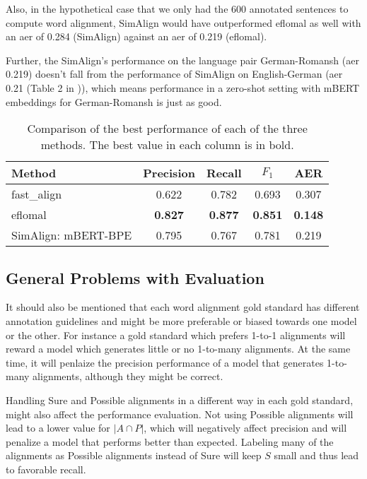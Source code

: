 Also, in the hypothetical case that we only had the 600 annotated sentences to compute word alignment, SimAlign would have outperformed eflomal as well with an \acrshort{aer} of 0.284 (SimAlign) against an \acrshort{aer} of 0.219 (eflomal). 

Further, the SimAlign's performance on the language pair German-Romansh (\acrshort{aer} 0.219) doesn't fall from the performance of SimAlign on English-German (\acrshort{aer} 0.21 (Table 2 in \cite{jalili-sabet-etal-2020-simalign})), which means performance in a zero-shot setting  with mBERT embeddings  for German-Romansh is just as good.

\begin{table}
\centering
\begin{tabular}{lcccc}
	\toprule
							Method & Precision & Recall & $F_1$ & AER \\
\midrule
  fast\_align& 0.622	  & 0.782  & 0.693 & 0.307 \\

							eflomal     & \textbf{0.827} & \textbf{0.877} & \textbf{0.851} & \textbf{0.148} \\

SimAlign:                     mBERT-BPE & 0.795   & 0.767  & 0.781  & 0.219 \\
\bottomrule
\end{tabular}
\caption{Comparison of the best performance of each of the three methods. 
The best value in each column is in bold.}
\label{tab:comparison}
\end{table}


\subsection{General Problems with Evaluation}
\label{sec:problems-evaluation}
It should also be mentioned that each word alignment gold standard has different annotation guidelines and might be more preferable or biased towards one model or the other. 
For instance a gold standard which prefers 1-to-1 alignments will reward a model which generates little or no 1-to-many alignments. 
At the same time, it will penlaize the precision performance of a model that generates 1-to-many alignments, although they might be correct.

Handling Sure and Possible alignments in a different way in each gold standard, might also affect the performance evaluation. 
Not using Possible alignments will lead to a lower value for $|A \cap P|$, which will negatively affect precision and will penalize a model that performs better than expected. 
Labeling many of the alignments as Possible alignments instead of Sure will keep $S$ small and thus lead to favorable recall. 


